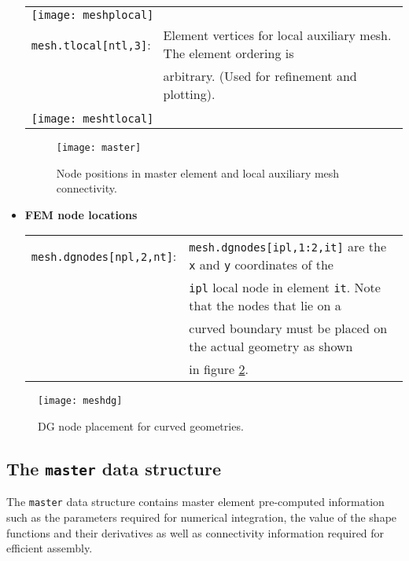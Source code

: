 \documentclass[11pt]{article}
\begin{document}
\begin{itemize}
\begin{tabular}{|ll}
	  \multicolumn{2}{|l}{ \texttt{[image: meshplocal]}} \\
	  
	\texttt{mesh.tlocal[ntl,3]}: & Element vertices for local auxiliary mesh. The element ordering is \\ & arbitrary. (Used for refinement and plotting). \\ \\
	
	 \multicolumn{2}{|l}{ \texttt{[image: meshtlocal]}} \\
\end{tabular}

\begin{figure}[h]
\begin{center}
	\texttt{[image: master]}  
	\end{center}
			\caption{Node positions in master element and local auxiliary mesh connectivity.  }
			\label{masterel}
\end{figure}

\item {\bf FEM node locations}

\begin{tabular}{|ll}
 \texttt{mesh.dgnodes[npl,2,nt]}: & \texttt{mesh.dgnodes[ipl,1:2,it]} are the \texttt{x} and \texttt{y} coordinates of the \\ & \texttt{ipl} local node in element \texttt{it}. Note that the nodes that lie on a \\ & curved boundary must be placed on the actual geometry as shown \\ &  in figure \ref{meshdgnodes}. \\
 \end{tabular}
\end{itemize}
 
 \begin{figure}[h]	
\begin{center}
	\texttt{[image: meshdg]}
	\end{center}
		\caption{DG node placement for curved geometries.  }
		\label{meshdgnodes}
\end{figure}
 
 \newpage
 
\subsection{The \texttt{master} data structure}

The \texttt{master} data structure contains master element pre-computed information such as  the parameters
required for numerical integration, the value of the shape functions and their derivatives as well as connectivity information required for efficient assembly.
\end{document}
